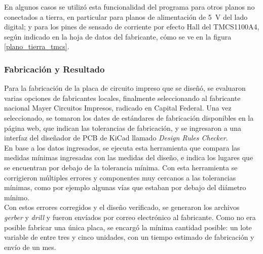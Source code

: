 En algunos casos se utilizó esta funcionalidad del programa para otros planos
no conectados a tierra, en particular para planos de alimentación de \SI[]{5}{\volt} del lado digital; y para los pines de sensado de corriente por efecto Hall del TMCS1100A4, según indicado en la hoja de datos del fabricante, cómo se ve en la figura \ref{plano_tierra_tmcs}.\\

\subsubsection{Fabricación y Resultado}

Para la fabricación de la placa de circuito impreso que se diseñó, se evaluaron varias opciones de fabricantes locales, finalmente seleccionando al fabricante nacional {\Medium Mayer Circuitos Impresos}, radicado en Capital Federal. Una vez seleccionado, se tomaron los dates de estándares de fabricación disponibles en la página web, que indican las tolerancias de fabricación, y se ingresaron a una interfaz del diseñador de PCB de KiCad llamado \textit{Design Rules Checker}.\\

En base a los datos ingresados, se ejecuta esta herramienta que compara las medidas mínimas ingresadas con las medidas del diseño, e indica los lugares que se encuentran por debajo de la tolerancia mínima. Con esta herramienta se corrigieron múltiples errores y componentes muy cercanos a las tolerancias mínimas, como por ejemplo algunas vías que estaban por debajo del diámetro mínimo.\\

Con estos errores corregidos y el diseño verificado, se generaron los archivos \textit{gerber} y \textit{drill} y fueron envíados por correo electrónico al fabricante. Como no era posible fabricar una única placa, se encargó la mínima cantidad posible: un lote variable de entre tres y cinco unidades, con un tiempo estimado de fabricación y envío de un mes.\\

